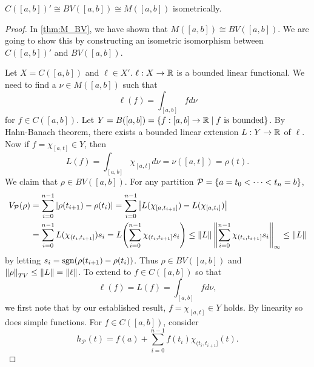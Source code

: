 \begin{theorem}\label{thm:dual_C}
    $C([a,b])'\cong BV([a,b])\cong M([a,b])$ isometrically.
\end{theorem}
\begin{proof}
    In \cref{thm:M_BV}, we have shown that $M([a,b])\cong BV([a,b])$. 
    We are going to show this by constructing an isometric 
    isomorphism between $C([a,b])'$ and $BV([a,b])$. 

    Let $X = C([a,b])$ and $\ell\in X'$. $\ell:X\to\mathbb{R}$ is a bounded 
    linear functional. We need to find a $\nu\in M([a,b])$ such that 
    \begin{equation*}
        \ell(f) = \int_{[a,b]} f d\nu
    \end{equation*}
    for $f\in C([a,b])$. Let $Y = B([a,b]) = 
    \left\{ f:[a,b]\to\mathbb{R} \;\middle\vert\; \text{$f$ is bounded} \right\}$. By Hahn-Banach theorem, 
    there exists a bounded linear extension $L:Y\to\mathbb{R}$ of $\ell$. Now if 
    $f = \chi_{[a,t]}\in Y$, then 
    \begin{equation*}
        L(f) = \int_{[a,b]} \chi_{[a,t]} d\nu = \nu([a,t]) = \rho(t).
    \end{equation*}
    We claim that $\rho\in BV([a,b])$. For any partition $\mathcal{P} 
    = \left\{ {a = t_0 < \cdots < t_n = b} \right\}$, 
    \begin{equation*}
        \begin{split}
            V_{\mathcal{P}}(\rho) &= \sum_{i=0}^{n-1} \abs{\rho(t_{i+1})-\rho(t_i)} 
            = \sum_{i=0}^{n-1} \abs{L(\chi_{[a,t_{i+1}]})-L(\chi_{[a,t_i]})} \\
            &= \sum_{i=0}^{n-1} L(\chi_{(t_i,t_{i+1}]})s_i = L\pth{\sum_{i=0}^{n-1} \chi_{(t_i,t_{i+1}]}s_i} 
            \leq \norm{L}\norm{\sum_{i=0}^{n-1} \chi_{(t_i,t_{i+1}]}s_i}_{\infty} \leq \norm{L}
        \end{split}
    \end{equation*}
    by letting $s_i = \operatorname{sgn}(\rho(t_{i+1})-\rho(t_i))$. Thus $\rho\in BV([a,b])$ 
    and $\left\lVert {\rho} \right\rVert_{TV}\leq\left\lVert {L} \right\rVert = \left\lVert {\ell} \right\rVert$. To extend to $f\in C([a,b])$ 
    so that 
    \begin{equation*}
        \ell(f) = L(f) = \int_{[a,b]} f d\nu,
    \end{equation*}
    we first note that by our established result, $f = \chi_{[a,t]}\in Y$ 
    holds. By linearity so does simple functions. For $f\in C([a,b])$, 
    consider 
    \begin{equation*}
        h_{\mathcal{P}}(t) = f(a) + \sum_{i=0}^{n-1} f(t_i)\chi_{(t_i,t_{i+1}]}(t).

\end{equation*}
\end{proof}
